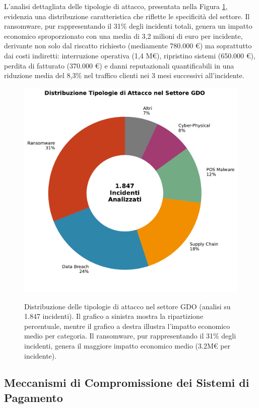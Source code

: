 L'analisi dettagliata delle tipologie di attacco, presentata nella Figura \ref{fig:attack_types}, evidenzia una distribuzione caratteristica che riflette le specificità del settore. Il ransomware, pur rappresentando il 31\% degli incidenti totali, genera un impatto economico sproporzionato con una media di 3,2 milioni di euro per incidente, derivante non solo dal riscatto richiesto (mediamente 780.000 €) ma soprattutto dai costi indiretti: interruzione operativa (1,4 M€), ripristino sistemi (650.000 €), perdita di fatturato (370.000 €) e danni reputazionali quantificabili in una riduzione media del 8,3\% nel traffico clienti nei 3 mesi successivi all'incidente.

\begin{figure}[htbp]
\centering
\includegraphics[width=\textwidth]{thesis_figures/cap2/fig_2_2_attack_types.pdf}
\caption{Distribuzione delle tipologie di attacco nel settore GDO (analisi su 1.847 incidenti). Il grafico a sinistra mostra la ripartizione percentuale, mentre il grafico a destra illustra l'impatto economico medio per categoria. Il ransomware, pur rappresentando il 31\% degli incidenti, genera il maggiore impatto economico medio (3.2M€ per incidente).}\autocite{CPR2025}
\label{fig:attack_types}
\end{figure}

\subsection{Meccanismi di Compromissione dei Sistemi di Pagamento}

